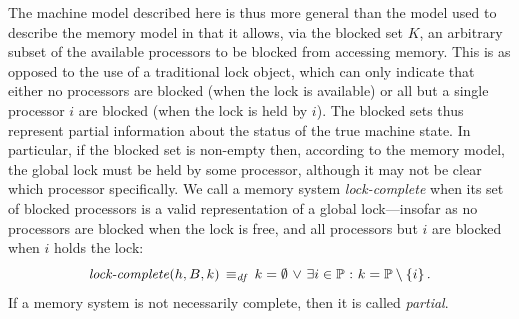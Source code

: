 \documentclass[11pt]{report}
\begin{document}

The machine model described here is thus more general than the model used to describe the memory model in that it allows, via the blocked set $K$, an arbitrary subset of the available processors to be blocked from accessing memory. This is as opposed to the use of a traditional lock object, which can only indicate that either no processors are blocked (when the lock is available) or all but a single processor $i$ are blocked (when the lock is held by $i$). The blocked sets thus represent partial information about the status of the true machine state. In particular, if the blocked set is non-empty then, according to the memory model, the global lock must be held by some processor, although it may not be clear which processor specifically. We call a memory system \emph{lock-complete} when its set of blocked processors is a valid representation of a global lock---insofar as no processors are blocked when the lock is free, and all processors but $i$ are blocked when $i$ holds the lock: \[ \text{\textit{lock-complete}}(h,B,k) \operatorname{\;\equiv_{\mathit{df}}\;} k = \operatorname{\emptyset} \operatorname{\,\vee\,} \exists i \in \mathbb{P} \operatorname{\,:\,} k = \mathbb{P} \setminus \left\lbrace i \right\rbrace.\] If a memory system is not necessarily complete, then it is called \emph{partial}.
\end{document}
